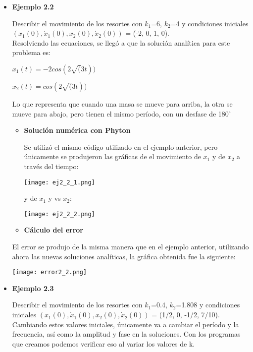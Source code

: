 \documentclass[12pt]{article}
\begin{document}
\begin{itemize}
\item \textbf{Ejemplo 2.2}

Describir el movimiento de los resortes con $k_1$=6, $k_2$=4 y condiciones iniciales $(x_1(0), \dot x_1(0), x_2(0), \dot x_2(0))$ = (-2, 0, 1, 0).\\

Resolviendo las ecuaciones, se llegó a que la solución analítica para este problema es: \\

\centerline{$x_1(t) = -2cos (2\sqrt (3t))$}
\centerline{$x_2(t) = cos (2\sqrt (3t))$}

Lo que representa que cuando una masa se mueve para arriba, la otra se mueve para abajo, pero tienen el mismo período, con un desfase de 180$^\circ$

\begin{itemize}
\item \textbf{Solución numérica con Phyton}

Se utilizó el mismo código utilizado en el ejemplo anterior, pero únicamente se produjeron las gráficas de el movimiento de $x_1$ y de $x_2$ a través del tiempo:


\begin{center}
        \texttt{[image: ej2\_2\_1.png]}
\end{center}

y de $x_1$ y vs $x_2$:


\begin{center}
        \texttt{[image: ej2\_2\_2.png]}
\end{center}

\item \textbf{Cálculo del error}
\end{itemize}

El error se produjo de la misma manera que en el ejemplo anterior, utilizando ahora las nuevas soluciones analíticas, la gráfica obtenida fue la siguiente:


\begin{center}
        \texttt{[image: error2\_2.png]}
\end{center}

\item \textbf{Ejemplo 2.3}

Describir el movimiento de los resortes con $k_1$=0.4, $k_2$=1.808 y condiciones iniciales $(x_1(0), \dot x_1(0), x_2(0), \dot x_2(0))$ = (1/2, 0, -1/2, 7/10).\\

Cambiando estos valores iniciales, únicamente va a cambiar el período y la frecuencia, así como la amplitud y fase en la soluciones. Con los programas que creamos podemos verificar eso al variar los valores de k. 


\end{itemize}
\end{document}
